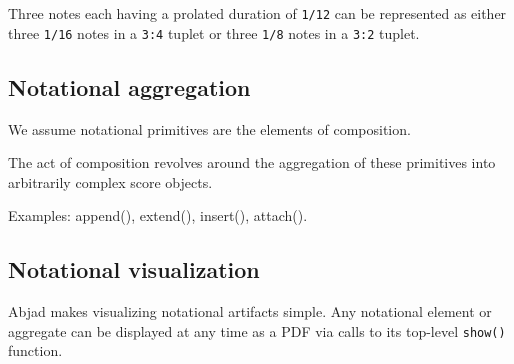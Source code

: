Three notes each having a prolated duration of \texttt{1/12} can be represented
as either three \texttt{1/16} notes in a \texttt{3:4} tuplet or three
\texttt{1/8} notes in a \texttt{3:2} tuplet.

\subsection{Notational aggregation}

We assume notational primitives are the elements of composition.

The act of composition revolves around the aggregation of these primitives into
arbitrarily complex score objects.

Examples: append(), extend(), insert(), attach().

\subsection{Notational visualization}

Abjad makes visualizing notational artifacts simple. Any notational element or
aggregate can be displayed at any time as a PDF via calls to its top-level
\texttt{show()} function.